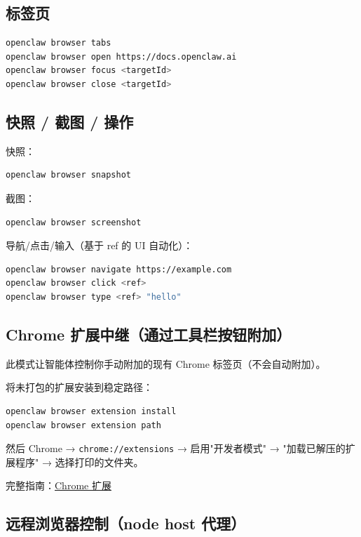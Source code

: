 \subsection{标签页}


\begin{lstlisting}[language=bash]
openclaw browser tabs
openclaw browser open https://docs.openclaw.ai
openclaw browser focus <targetId>
openclaw browser close <targetId>
\end{lstlisting}


\subsection{快照 / 截图 / 操作}


快照：

\begin{lstlisting}[language=bash]
openclaw browser snapshot
\end{lstlisting}


截图：

\begin{lstlisting}[language=bash]
openclaw browser screenshot
\end{lstlisting}


导航/点击/输入（基于 ref 的 UI 自动化）：

\begin{lstlisting}[language=bash]
openclaw browser navigate https://example.com
openclaw browser click <ref>
openclaw browser type <ref> "hello"
\end{lstlisting}


\subsection{Chrome 扩展中继（通过工具栏按钮附加）}


此模式让智能体控制你手动附加的现有 Chrome 标签页（不会自动附加）。

将未打包的扩展安装到稳定路径：

\begin{lstlisting}[language=bash]
openclaw browser extension install
openclaw browser extension path
\end{lstlisting}


然后 Chrome → \texttt{chrome://extensions} → 启用"开发者模式" → "加载已解压的扩展程序" → 选择打印的文件夹。

完整指南：\href{/tools/chrome-extension}{Chrome 扩展}

\subsection{远程浏览器控制（node host 代理）}


